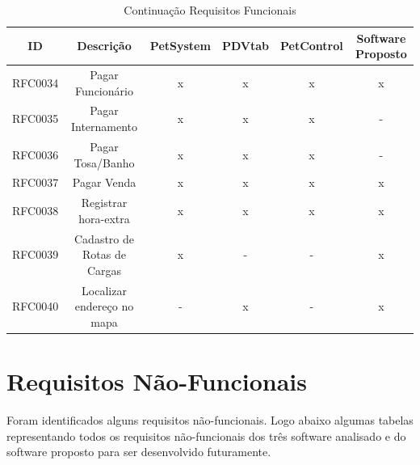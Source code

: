 \documentclass[12pt,openright,twoside,a4paper,english,french,spanish,brazil]{abntex2}
\begin{document}
\begin{landscape}
\begin{table}[!htpb]
\centering
\caption{Continuação Requisitos Funcionais}\label{tab02_requisitosFuncionais}
\begin{small} 
\setlength{\tabcolsep}{3pt} 
\begin{tabular}{rccccc}
    \toprule
    \multicolumn{1}{c}{\textbf{ID}} & \textbf{Descrição} & \textbf{PetSystem} & \textbf{PDVtab} & \textbf{PetControl} & \textbf{Software Proposto} \\
    \midrule
    RFC0034 & Pagar Funcionário & x & x & x & x \\
    RFC0035 & Pagar Internamento & x & x & x & - \\
    RFC0036 & Pagar Tosa/Banho & x & x & x & - \\
    RFC0037 & Pagar Venda & x & x & x & x \\
    RFC0038 & Registrar hora-extra & x & x & x & x \\
    RFC0039 & Cadastro de Rotas de Cargas & x & - & - & x \\
    RFC0040 & Localizar endereço no mapa & - & x & - & x \\
    \bottomrule
    \end{tabular}%
\end{small}
\end{table}
\end{landscape}

\section*{Requisitos Não-Funcionais}

Foram identificados alguns requisitos não-funcionais. Logo abaixo algumas tabelas representando todos os requisitos não-funcionais dos três software analisado e do software proposto para ser desenvolvido futuramente.
\newpage
\end{document}
